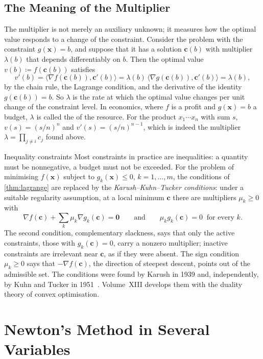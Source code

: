 \subsection{The Meaning of the Multiplier}

The multiplier is not merely an auxiliary unknown; it measures how the optimal value responds to a change of the constraint. Consider the problem with the constraint $g(\mathbf x)=b$, and suppose that it has a solution $\mathbf c(b)$ with multiplier $\lambda(b)$ that depends differentiably on $b$. Then the optimal value $v(b)\coloneqq f(\mathbf c(b))$ satisfies
\[
v'(b)=\langle\nabla f(\mathbf c(b)),\mathbf c'(b)\rangle=\lambda(b)\,\langle\nabla g(\mathbf c(b)),\mathbf c'(b)\rangle=\lambda(b),
\]
by the chain rule, the Lagrange condition, and the derivative of the identity $g(\mathbf c(b))=b$. So $\lambda$ is the rate at which the optimal value changes per unit change of the constraint level. In economics, where $f$ is a profit and $g(\mathbf x)=b$ a budget, $\lambda$ is called the  of the resource. For the product $x_1\cdots x_n$ with sum $s$, $v(s)=(s/n)^n$ and $v'(s)=(s/n)^{n-1}$, which is indeed the multiplier $\lambda=\prod_{j\ne i}c_j$ found above.

\begin{note}{Inequality constraints}
Most constraints in practice are inequalities: a quantity must be nonnegative, a budget must not be exceeded. For the problem of minimising $f(\mathbf x)$ subject to $g_k(\mathbf x)\le0$, $k=1,\ldots,m$, the conditions of \cref{thm:lagrange} are replaced by the \emph{Karush--Kuhn--Tucker conditions}: under a suitable regularity assumption, at a local minimum $\mathbf c$ there are multipliers $\mu_k\ge0$ with
\[
\nabla f(\mathbf c)+\sum_k\mu_k\nabla g_k(\mathbf c)=\mathbf0\qquad\text{and}\qquad\mu_kg_k(\mathbf c)=0\ \text{ for every }k .
\]
The second condition, complementary slackness, says that only the active constraints, those with $g_k(\mathbf c)=0$, carry a nonzero multiplier; inactive constraints are irrelevant near $\mathbf c$, as if they were absent. The sign condition $\mu_k\ge0$ says that $-\nabla f(\mathbf c)$, the direction of steepest descent, points out of the admissible set. The conditions were found by Karush in 1939 and, independently, by Kuhn and Tucker in 1951~\cite{karush1939,kuhn1951}. Volume~XIII develops them with the duality theory of convex optimisation.
\end{note}

\section{Newton's Method in Several Variables}
\label{sec:newton-n}

